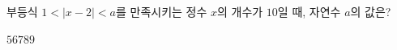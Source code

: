부등식 $1<|x-2|<a$를 만족시키는 정수 $x$의 개수가 $10$일 때, 자연수 $a$의 값은?
\begin{choices32}{$5$}{$6$}{$7$}{$8$}{$9$}\end{choices32}
